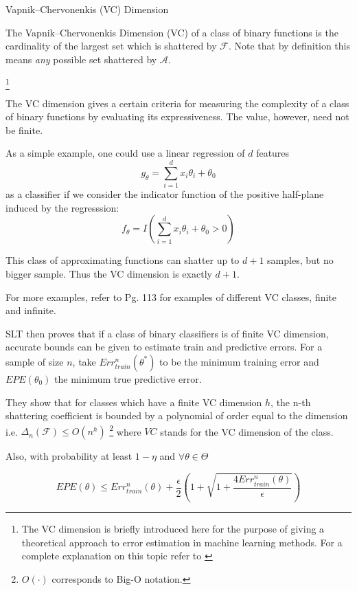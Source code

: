 \begin{definition}{Vapnik–Chervonenkis (VC) Dimension}
	
	The Vapnik–Chervonenkis Dimension (VC) of a class of binary functions is the cardinality of the largest set which is shattered by $\mathcal {F}$. Note that by definition this means \textit{any} possible set shattered by $\mathcal {A}$.
\end{definition}\footnote{The VC dimension is briefly introduced here for the purpose of giving a theoretical approach to error estimation in machine learning methods. For a complete explanation on this topic refer to \cite{vapnik-nature2013}}

The VC dimension gives a certain criteria for measuring the complexity of a class of binary functions by evaluating its expressiveness. The value, however, need not be finite.

As a simple example, one could use a linear regression of $d$ features $$g_{\theta} = \sum_{i=1}^d x_i \theta_i + \theta_0$$ as a classifier if we consider the indicator function of the positive half-plane induced by the regresssion: $$f_{\theta} = I(\sum_{i=1}^d x_i \theta_i + \theta_0 > 0)$$

This class of approximating functions can shatter up to $d+1$ samples, but no bigger sample. Thus the VC dimension is exactly $d+1$. 

For more examples, refer to \cite{cherkassky-learning2007} Pg. 113 for examples of different VC classes, finite and infinite.

SLT then proves that if a class of binary classifiers is of finite VC dimension, accurate bounds can be given to estimate train and predictive errors. For a sample of size $n$, take $Err^n_{train}(\theta^*)$ to be the minimum training error and $EPE(\theta_0)$ the minimum true predictive error. 

They show that for classes which have a finite VC dimension $h$, the n-th shattering coefficient is bounded by a polynomial of order equal to the dimension 
i.e. $\Delta_n(\mathcal {F}) \leq O(n^{h})$ \footnote{$O(\cdot)$ corresponds to Big-O notation.} where $VC$ stands for the VC dimension of the class.

Also, with probability at least $1 - \eta$ and $\forall \theta \in \Theta$

\begin{equation}\label{vapnik-classificationBound}
EPE(\theta) \leq  Err^n_{train}(\theta) + \frac{\epsilon}{2} \left(1 + \sqrt{1 + \frac{4 Err^n_{train}(\theta)  }{\epsilon}}  \right)    
\end{equation}

